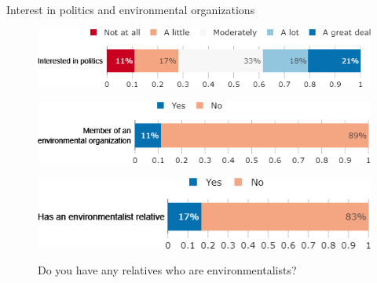 \documentclass[aspectratio=169,9pt,dvipsnames]{beamer}
\begin{document}
\begin{frame}{Interest in politics and environmental organizations}%
\vspace{-.5cm}
\begin{figure}[h!]
\caption{To what extent are you interested in politics?}
\includegraphics[width=.6\textwidth]{../figures/US/interested_politics_US.png} \\
\vspace{.1cm}
\caption{Are you member of an environmental organization?}
\includegraphics[width=.54\textwidth]{../figures/US/member_environmental_orga_US.png}\\
\vspace{.1cm}
\caption{Do you have any relatives who are environmentalists?}
\includegraphics[width=.54\textwidth]{../figures/US/relative_environmentalist_US.png}\\
\end{figure}
\end{frame}
\end{document}
